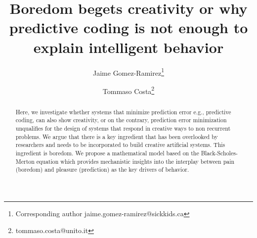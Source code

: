 \documentclass[11pt, onecolumn]{article}
\begin{document}
\title{Boredom begets creativity or why predictive coding is not enough to explain intelligent behavior}

\author[1]{Jaime Gomez-Ramirez\thanks{Corresponding author \hspace{0.6cm} jaime.gomez-ramirez@sickkids.ca}}
\author[2]{Tommaso Costa\thanks{\hspace{0.6cm} tommaso.costa@unito.it}}

\date{}
\maketitle

\begin{abstract}
Here, we investigate whether systems that minimize prediction error e.g., predictive coding, can also show creativity, or on the contrary, prediction error minimization unqualifies for the design of systems that respond in creative ways to non recurrent problems. 
We argue that there is a key ingredient that has been overlooked by researchers and needs to be incorporated to build creative artificial systems. This ingredient is boredom. We propose a mathematical model based on the Black-Scholes-Merton equation which provides mechanistic insights into the interplay between pain (boredom) and pleasure (prediction) as the key drivers of behavior.
\end{abstract}
\end{document}

